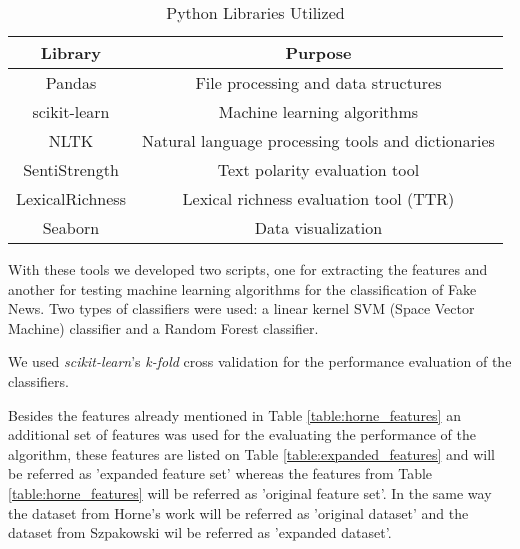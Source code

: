 \documentclass[conference]{IEEEtran}
\begin{document}
\begin{table}[htbp]
\caption{Python Libraries Utilized}
\begin{center}
\begin{tabular}{ |c|c| }
\hline
Library & Purpose \\ \hline
Pandas & File processing and data structures \\ \hline
scikit-learn & Machine learning algorithms \\ \hline
NLTK & Natural language processing tools and dictionaries \\ \hline
SentiStrength & Text polarity evaluation tool \\ \hline
LexicalRichness & Lexical richness evaluation tool (TTR) \\ \hline
Seaborn & Data visualization \\ \hline
\end{tabular}
\label{table:python_libs}
\end{center}
\end{table}

With these tools we developed two scripts, one for extracting the features and another for testing
machine learning algorithms for the classification of Fake News. Two types of classifiers were used:
a linear kernel SVM (Space Vector Machine) classifier and a Random Forest classifier.

We used \textit{scikit-learn}'s \textit{k-fold} cross validation for the performance evaluation of
the classifiers.

Besides the features already mentioned in Table \ref{table:horne_features} an additional set of features
was used for the evaluating the performance of the algorithm, these features are listed on Table
\ref{table:expanded_features} and will be referred as 'expanded feature set' whereas the features from
Table \ref{table:horne_features} will be referred as 'original feature set'. In the same way the dataset
from Horne's work \cite{horne_2017} will be referred as 'original dataset' and the dataset from Szpakowski
\cite{szpakowski_2019} wil be referred as 'expanded dataset'.
\end{document}
